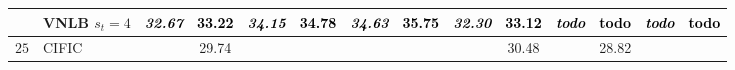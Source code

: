 \documentclass[10pt, journal, twocolumn, final, a4paper]{IEEEtran}
\newcommand{\best}[1]{#1}
\newcommand{\bsic}[1]{\textcolor{black}{\textit{#1}}}
\newcommand{\Bsic}[1]{\textcolor{black}{\textbf{\textit{#1}}}}
\newcommand{\Best}[1]{\textbf{\textcolor{black}{#1}}}
\begin{document}
\begin{table}[htp!]
\begin{center}
{\begin{tabular}{ c | l |c c | c c | c c | c c | c c | c c}
			                      & VNLB   $s_t = 4$     & \Bsic{32.67} & \Best{33.22} & \Bsic{34.15} & \Best{34.78} & \Bsic{34.63} & \Best{35.75} & \Bsic{32.30} & \Best{33.12} & \Bsic{todo } & \Best{todo } & \Bsic{todo } & \Best{todo } \\\hline
%                                                                                                                                                                                                                                         
			\multirow{1}{*}{$25$}
			                      & CIFIC                & \bsic{     } &       29.74  & \bsic{     } &              & \bsic{     } &              & \bsic{     } &       30.48  & \bsic{     } &       28.82  & \bsic{     } &              \\

\end{tabular}}
\end{center}
\end{table}
\end{document}
